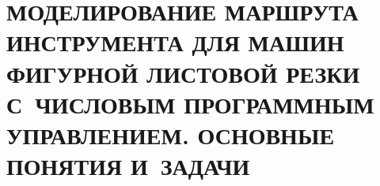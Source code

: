 

\chapter{
  МОДЕЛИРОВАНИЕ МАРШРУТА ИНСТРУМЕНТА ДЛЯ МАШИН ФИГУРНОЙ ЛИСТОВОЙ РЕЗКИ
  С~ЧИСЛОВЫМ ПРОГРАММНЫМ УПРАВЛЕНИЕМ.
  ОСНОВНЫЕ ПОНЯТИЯ И~ЗАДАЧИ
}
\setcounter{chapter}{1}
\setcounter{equation}{0}





